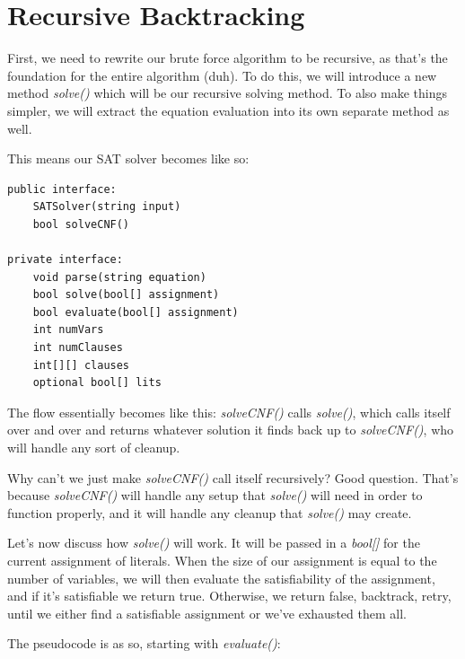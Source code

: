 \section{Recursive Backtracking}

First, we need to rewrite our brute force algorithm to be recursive, as that's
the foundation for the entire algorithm (duh). To do this, we will introduce a
new method \textit{solve()} which will be our recursive solving method. To
also make things simpler, we will extract the equation evaluation into its own
separate method as well.

This means our SAT solver becomes like so:

\begin{lstlisting}
public interface:
    SATSolver(string input)
    bool solveCNF()

private interface:
    void parse(string equation)
    bool solve(bool[] assignment)
    bool evaluate(bool[] assignment)
    int numVars
    int numClauses
    int[][] clauses
    optional bool[] lits
\end{lstlisting}

The flow essentially becomes like this: \textit{solveCNF()} calls
\textit{solve()}, which calls itself over and over and returns whatever solution
it finds back up to \textit{solveCNF()}, who will handle any sort of cleanup.

Why can't we just make \textit{solveCNF()} call itself recursively? Good question.
That's because \textit{solveCNF()} will handle any setup that
\textit{solve()} will need in order to function properly, and it will handle any
cleanup that \textit{solve()} may create.

Let's now discuss how \textit{solve()} will work.
It will be passed in a \textit{bool[]} for the current assignment of literals.
When the size of our assignment is equal to the number of variables, we will
then evaluate the satisfiability of the assignment, and if it's satisfiable we
return true. Otherwise, we return false, backtrack, retry, until we either find a
satisfiable assignment or we've exhausted them all.

The pseudocode is as so, starting with \textit{evaluate()}:

